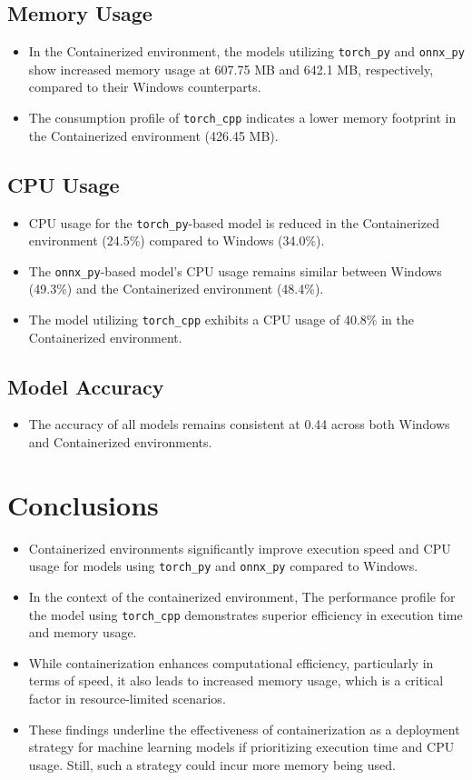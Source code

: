 \documentclass{article}
\begin{document}
\subsection{Memory Usage}
\begin{itemize}
    \item In the Containerized environment, the models utilizing \texttt{torch\_py} and \texttt{onnx\_py} show increased memory usage at 607.75 MB and 642.1 MB, respectively, compared to their Windows counterparts.
    \item The consumption profile of \texttt{torch\_cpp} indicates a lower memory footprint in the Containerized environment (426.45 MB).
\end{itemize}

\subsection{CPU Usage}
\begin{itemize}
    \item CPU usage for the \texttt{torch\_py}-based model is reduced in the Containerized environment (24.5\%) compared to Windows (34.0\%).
    \item The \texttt{onnx\_py}-based model's CPU usage remains similar between Windows (49.3\%) and the Containerized environment (48.4\%).
    \item The model utilizing \texttt{torch\_cpp} exhibits a CPU usage of 40.8\% in the Containerized environment.
\end{itemize}

\subsection{Model Accuracy}
\begin{itemize}
    \item The accuracy of all models remains consistent at 0.44 across both Windows and Containerized environments.
\end{itemize}

\section{Conclusions}
\begin{itemize}
    \item Containerized environments significantly improve execution speed and CPU usage for models using \texttt{torch\_py} and \texttt{onnx\_py} compared to Windows.
    \item In the context of the containerized environment, The performance profile for the model using \texttt{torch\_cpp} demonstrates superior efficiency in execution time and memory usage.
    \item While containerization enhances computational efficiency, particularly in terms of speed, it also leads to increased memory usage, which is a critical factor in resource-limited scenarios.
    \item These findings underline the effectiveness of containerization as a deployment strategy for machine learning models if prioritizing execution time and CPU usage. Still, such a strategy could incur more memory being used.
\end{itemize}
\end{document}
